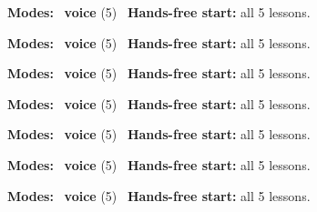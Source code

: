 \expandafter\def\csname hlchaptermodality67\endcsname{%
  {\small\noindent
    \textbf{Modes:} \hlvoicesign{}~\textbf{voice} (5)\quad
    \hlvoicesign{}~\textbf{Hands-free start:} all 5 lessons.%
    \par}\medskip
}

\expandafter\def\csname hlchaptermodality68\endcsname{%
  {\small\noindent
    \textbf{Modes:} \hlvoicesign{}~\textbf{voice} (5)\quad
    \hlvoicesign{}~\textbf{Hands-free start:} all 5 lessons.%
    \par}\medskip
}

\expandafter\def\csname hlchaptermodality69\endcsname{%
  {\small\noindent
    \textbf{Modes:} \hlvoicesign{}~\textbf{voice} (5)\quad
    \hlvoicesign{}~\textbf{Hands-free start:} all 5 lessons.%
    \par}\medskip
}

\expandafter\def\csname hlchaptermodality70\endcsname{%
  {\small\noindent
    \textbf{Modes:} \hlvoicesign{}~\textbf{voice} (5)\quad
    \hlvoicesign{}~\textbf{Hands-free start:} all 5 lessons.%
    \par}\medskip
}

\expandafter\def\csname hlchaptermodality71\endcsname{%
  {\small\noindent
    \textbf{Modes:} \hlvoicesign{}~\textbf{voice} (5)\quad
    \hlvoicesign{}~\textbf{Hands-free start:} all 5 lessons.%
    \par}\medskip
}

\expandafter\def\csname hlchaptermodality72\endcsname{%
  {\small\noindent
    \textbf{Modes:} \hlvoicesign{}~\textbf{voice} (5)\quad
    \hlvoicesign{}~\textbf{Hands-free start:} all 5 lessons.%
    \par}\medskip
}

\expandafter\def\csname hlchaptermodality73\endcsname{%
  {\small\noindent
    \textbf{Modes:} \hlvoicesign{}~\textbf{voice} (5)\quad
    \hlvoicesign{}~\textbf{Hands-free start:} all 5 lessons.%
    \par}\medskip
}
